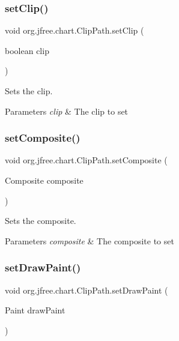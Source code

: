 \subsubsection{\texorpdfstring{set\+Clip()}{setClip()}}
{\footnotesize\ttfamily void org.\+jfree.\+chart.\+Clip\+Path.\+set\+Clip (\begin{DoxyParamCaption}\item[{boolean}]{clip }\end{DoxyParamCaption})}

Sets the clip.


\begin{DoxyParams}{Parameters}
{\em clip} & The clip to set \\
\hline
\end{DoxyParams}
\mbox{\label{classorg_1_1jfree_1_1chart_1_1_clip_path_aa5ea3fcd80ea309a0eb96fda3e85f8fe}} 
\subsubsection{\texorpdfstring{set\+Composite()}{setComposite()}}
{\footnotesize\ttfamily void org.\+jfree.\+chart.\+Clip\+Path.\+set\+Composite (\begin{DoxyParamCaption}\item[{Composite}]{composite }\end{DoxyParamCaption})}

Sets the composite.


\begin{DoxyParams}{Parameters}
{\em composite} & The composite to set \\
\hline
\end{DoxyParams}
\mbox{\label{classorg_1_1jfree_1_1chart_1_1_clip_path_a470e8173222a56f7d9c7aca89aa68561}} 
\subsubsection{\texorpdfstring{set\+Draw\+Paint()}{setDrawPaint()}}
{\footnotesize\ttfamily void org.\+jfree.\+chart.\+Clip\+Path.\+set\+Draw\+Paint (\begin{DoxyParamCaption}\item[{Paint}]{draw\+Paint }\end{DoxyParamCaption})}

